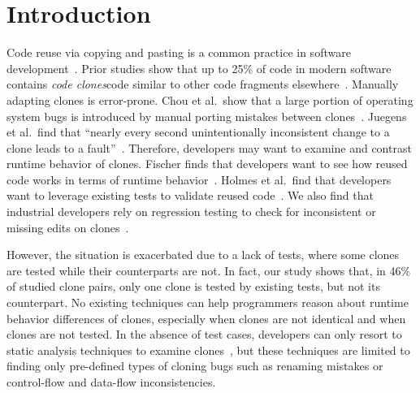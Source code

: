 \section{Introduction}
Code reuse via copying and pasting is a common practice in software development~\cite{Kim2004, Jiang2007, Li2004}. Prior studies show that up to 25\% of code in modern software contains {\em code clones}\textemdash code similar to other code fragments elsewhere~\cite{baker1995finding, Al-Ekram2005:byaccident, roy2008empirical}. Manually adapting clones is error-prone. Chou et al.~show that a large portion of operating system bugs is introduced by manual porting mistakes between clones~\cite{Chou2001}. Juegens et al.~find that ``nearly every second unintentionally inconsistent change to a clone leads to a fault''~\cite{juergens2009code}. Therefore, developers may want to examine and contrast runtime behavior of clones. Fischer finds that developers want to see how reused code works in terms of runtime behavior~\cite{fischer1987cognitive}. Holmes et al.~find that developers want to leverage existing tests to validate reused code~\cite{holmes2007supporting}. We also find that industrial developers rely on regression testing to check for inconsistent or missing edits on clones~\cite{zhang2015interactive}.

However, the situation is exacerbated due to a lack of tests, where some clones are tested while their counterparts are not. In fact, our study shows that, in 46\% of studied clone pairs, only one clone is tested by existing tests, but not its counterpart. No existing techniques can help programmers reason about runtime behavior differences of clones, especially when clones are not identical and when clones are not tested. In the absence of test cases, developers can only resort to static analysis techniques to examine clones~\cite{Li2004, Jiang2007, Pham2010:vulnerability, Ray2013:spa, zhang2015interactive}, but these techniques are limited to finding only pre-defined types of cloning bugs such as renaming mistakes or control-flow and data-flow inconsistencies.


